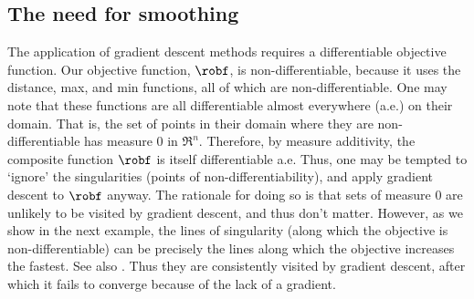 \subsection{The need for smoothing}
\label{sec:need for smoothing}



The application of gradient descent methods requires a differentiable objective function. 
Our objective function, $\robf$, is non-differentiable, because it uses the distance, max, and min functions, all of which are non-differentiable.
One may note that these functions are all differentiable almost everywhere (a.e.) on their domain.
That is, the set of points in their domain where they are non-differentiable has measure 0 in $\Re^n$. 
Therefore, by measure additivity, the composite function $\robf$ is itself differentiable a.e.
Thus, one may be tempted to `ignore' the singularities (points of non-differentiability), and apply gradient descent to $\robf$ anyway.
The rationale for doing so is that sets of measure 0 are unlikely to be visited by gradient descent, and thus don't matter. 
However, as we show in the next example, the lines of singularity (along which the objective is non-differentiable) can be  precisely the lines along which the objective increases the fastest.
See also \cite{Cortes08_Discontinuous}.
Thus they are consistently visited by gradient descent, after which it fails to converge because of the lack of a gradient.


